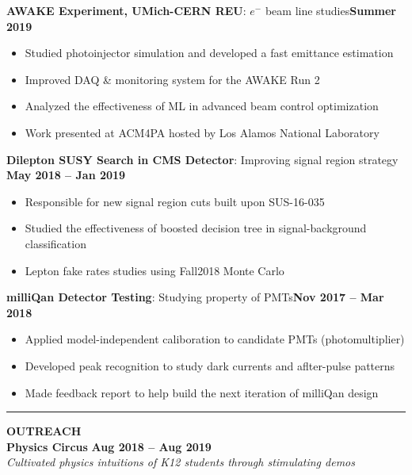 \begin{vitae}
    \textbf{AWAKE Experiment, UMich-CERN REU}: $e^-$ beam line studies\hfill \textbf{Summer 2019}
    \begin{itemize}
        \item Studied photoinjector simulation and developed a fast emittance estimation
        \item Improved DAQ \& monitoring system for the AWAKE Run 2
        \item Analyzed the effectiveness of ML in advanced beam control optimization
        \item Work presented at ACM4PA hosted by Los Alamos National Laboratory
    \end{itemize}

    \textbf{Dilepton SUSY Search in CMS Detector}: Improving signal region strategy \hfill \textbf{May 2018 -- Jan 2019}
    \begin{itemize}
        \item Responsible for new signal region cuts built upon SUS-16-035
        \item Studied the effectiveness of boosted decision tree in signal-background classification
        \item Lepton fake rates studies using Fall2018 Monte Carlo
    \end{itemize}
    \textbf{milliQan Detector Testing}: Studying property of PMTs\hfill \textbf{Nov 2017 -- Mar 2018}
    \begin{itemize}
        \item Applied model-independent caliboration to candidate PMTs (photomultiplier) 
        \item Developed peak recognition to study dark currents and aflter-pulse patterns
        \item Made feedback report to help build the next iteration of milliQan design
    \end{itemize}
    \noindent\rule{\textwidth}{1pt}
    \smallskip
    \textbf{\large OUTREACH} \\
    \textbf{Physics Circus} \hfill \textbf{Aug 2018 -- Aug 2019}\\
    \textsl{Cultivated physics intuitions of K12 students through stimulating demos}


\end{vitae}
